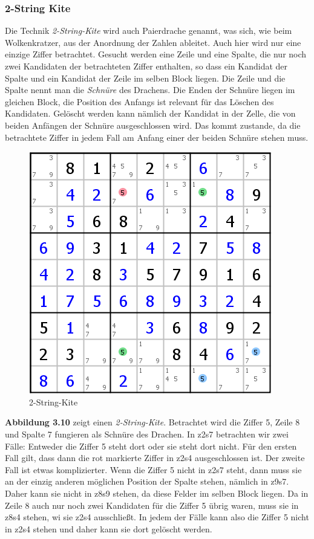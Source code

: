 \newpage
\subsubsection{2-String Kite}
Die Technik \textit{2-String-Kite} wird auch Paierdrache genannt, was sich, wie beim Wolkenkratzer, aus der Anordnung der Zahlen ableitet. Auch hier wird nur eine einzige Ziffer betrachtet. Gesucht werden eine Zeile und eine Spalte, die nur noch zwei Kandidaten der betrachteten Ziffer enthalten, so dass ein Kandidat der Spalte und ein Kandidat der Zeile im selben Block liegen. Die Zeile und die Spalte nennt man die \textit{Schnüre} des Drachens. Die Enden der Schnüre liegen im gleichen Block, die Position des Anfangs ist relevant für das Löschen des Kandidaten. Gelöscht werden kann nämlich der Kandidat in der Zelle, die von beiden Anfängen der Schnüre ausgeschlossen wird. Das kommt zustande, da die betrachtete Ziffer in jedem Fall am Anfang einer der beiden Schnüre stehen muss.

\begin{figure}[h]
\begin{center}
\includegraphics{./img/2stringkite.png}
\caption{2-String-Kite}
\end{center}
\end{figure}

\textbf{Abbildung 3.10} zeigt einen \textit{2-String-Kite}. Betrachtet wird die Ziffer 5, Zeile 8 und Spalte 7 fungieren als Schnüre des Drachen. In z2s7 betrachten wir zwei Fälle: Entweder die Ziffer 5 steht dort oder sie steht dort nicht. Für den ersten Fall gilt, dass dann die rot markierte Ziffer in z2s4 ausgeschlossen ist. Der zweite Fall ist etwas komplizierter. Wenn die Ziffer 5 nicht in z2s7 steht, dann muss sie an der einzig anderen möglichen Position der Spalte stehen, nämlich in z9s7. Daher kann sie nicht in z8s9 stehen, da diese Felder im selben Block liegen. Da in Zeile 8 auch nur noch zwei Kandidaten für die Ziffer 5 übrig waren, muss sie in z8s4 stehen, wi sie z2s4 ausschließt. In jedem der Fälle kann also die Ziffer 5 nicht in z2s4 stehen und daher kann sie dort gelöscht werden.